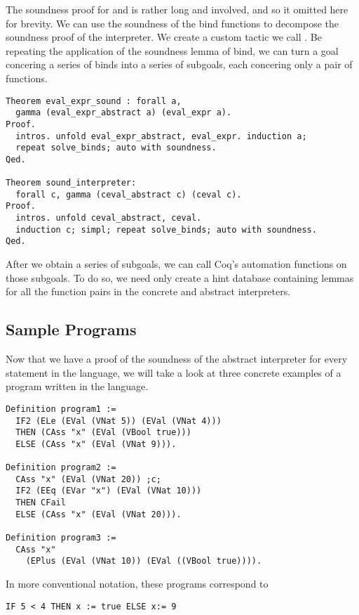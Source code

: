 The soundness proof for  and  is
rather long and involved, and so it omitted here for brevity. We can use the
soundness of the bind functions to decompose the soundness proof of the
interpreter. We create a custom tactic we call . Be repeating
the application of the soundness lemma of bind, we can turn a goal concering a
series of binds into a series of subgoals, each concering only a pair of
functions.

\begin{verbatim}
Theorem eval_expr_sound : forall a,
  gamma (eval_expr_abstract a) (eval_expr a).
Proof.
  intros. unfold eval_expr_abstract, eval_expr. induction a; 
  repeat solve_binds; auto with soundness. 
Qed.

Theorem sound_interpreter:
  forall c, gamma (ceval_abstract c) (ceval c).
Proof.
  intros. unfold ceval_abstract, ceval. 
  induction c; simpl; repeat solve_binds; auto with soundness.
Qed.
\end{verbatim}

After we obtain a series of subgoals, we can call Coq's automation functions on
those subgoals. To do so, we need only create a hint database containing lemmas
for all the function pairs in the concrete and abstract interpreters.

\subsection{Sample Programs}
Now that we have a proof of the soundness of the abstract interpreter for every
statement in the language, we will take a look at three concrete examples of a
program written in the language. 

\begin{verbatim}
Definition program1 := 
  IF2 (ELe (EVal (VNat 5)) (EVal (VNat 4))) 
  THEN (CAss "x" (EVal (VBool true))) 
  ELSE (CAss "x" (EVal (VNat 9))).

Definition program2 :=
  CAss "x" (EVal (VNat 20)) ;c;
  IF2 (EEq (EVar "x") (EVal (VNat 10)))
  THEN CFail
  ELSE (CAss "x" (EVal (VNat 20))).

Definition program3 :=
  CAss "x" 
  	(EPlus (EVal (VNat 10)) (EVal ((VBool true)))).
\end{verbatim}

In more conventional notation, these programs correspond to

\begin{lstlisting}
IF 5 < 4 THEN x := true ELSE x:= 9
\end{lstlisting}


